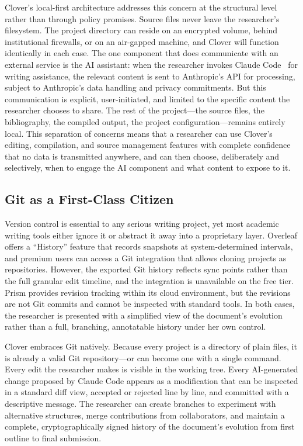 \documentclass[a4paper,11pt]{article}
\begin{document}
Clover's local-first architecture addresses this concern at the structural level rather than through policy promises. Source files never leave the researcher's filesystem. The project directory can reside on an encrypted volume, behind institutional firewalls, or on an air-gapped machine, and Clover will function identically in each case. The one component that does communicate with an external service is the AI assistant: when the researcher invokes Claude Code~\cite{ClaudeCode} for writing assistance, the relevant content is sent to Anthropic's API for processing, subject to Anthropic's data handling and privacy commitments. But this communication is explicit, user-initiated, and limited to the specific content the researcher chooses to share. The rest of the project---the source files, the bibliography, the compiled output, the project configuration---remains entirely local. This separation of concerns means that a researcher can use Clover's editing, compilation, and source management features with complete confidence that no data is transmitted anywhere, and can then choose, deliberately and selectively, when to engage the AI component and what content to expose to it.

\subsection{Git as a First-Class Citizen}

Version control is essential to any serious writing project, yet most academic writing tools either ignore it or abstract it away into a proprietary layer. Overleaf offers a ``History'' feature that records snapshots at system-determined intervals, and premium users can access a Git integration that allows cloning projects as repositories. However, the exported Git history reflects sync points rather than the full granular edit timeline, and the integration is unavailable on the free tier. Prism provides revision tracking within its cloud environment, but the revisions are not Git commits and cannot be inspected with standard tools. In both cases, the researcher is presented with a simplified view of the document's evolution rather than a full, branching, annotatable history under her own control.

Clover embraces Git natively. Because every project is a directory of plain files, it is already a valid Git repository---or can become one with a single command. Every edit the researcher makes is visible in the working tree. Every AI-generated change proposed by Claude Code appears as a modification that can be inspected in a standard diff view, accepted or rejected line by line, and committed with a descriptive message. The researcher can create branches to experiment with alternative structures, merge contributions from collaborators, and maintain a complete, cryptographically signed history of the document's evolution from first outline to final submission.
\end{document}
